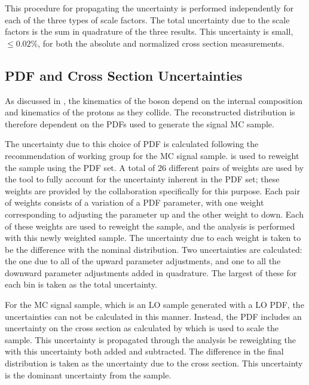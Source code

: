 This procedure for propagating the uncertainty is performed independently for
each of the three types of scale factors. The total uncertainty due to the
scale factors is the sum in quadrature of the three results. This uncertainty
is small, $\le 0.02\%$, for both the absolute and normalized cross section
measurements.

\subsection{PDF and Cross Section Uncertainties}
\label{ssec:pdf_uncertainties}

As discussed in , the kinematics of
the \Z boson depend on the internal composition and kinematics of the protons
as they collide. The reconstructed \phistar distribution is therefore dependent
on the PDFs used to generate the signal MC sample.

The uncertainty due to this choice of PDF is calculated following the
recommendation of \PDFforLHC working group for the \POWHEG MC signal sample.
\PDFWeightProducer is used to reweight the \POWHEG sample using the \CTten PDF
set. A total of \num{26} different pairs of weights are used by the tool to
fully account for the uncertainty inherent in the PDF set; these weights are
provided by the \CTten collaboration specifically for this purpose. Each pair
of weights consists of a variation of a PDF parameter, with one weight
corresponding to adjusting the parameter up and the other weight to down. Each of
these weights are used to reweight the \POWHEG sample, and the analysis is
performed with this newly weighted sample.
The uncertainty due to each weight is taken to be the difference with the
nominal \phistar distribution. Two uncertainties are calculated: the
one due to all of the upward parameter adjustments, and one to all the downward
parameter adjustments added in quadrature. The largest of these for each
\phistar bin is taken as the total uncertainty.

For the \MADGRAPH MC signal sample, which is an LO sample generated with a LO
PDF, the uncertainties can not be calculated in this manner. Instead, the PDF
includes an uncertainty on the cross section as calculated by \FEWZ which is
used to scale the sample. This uncertainty is propagated through the analysis
be reweighting the \MADGRAPH with this uncertainty both added and subtracted.
The difference in the final \phistar distribution is taken as the uncertainty
due to the \FEWZ cross section. This uncertainty is the dominant uncertainty
from the \MADGRAPH sample.

